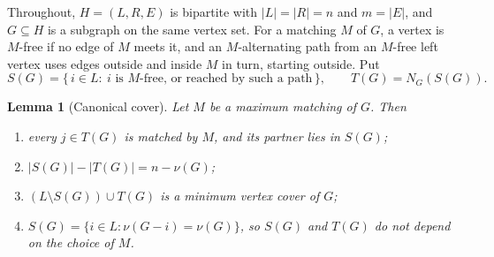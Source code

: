 \documentclass[11pt]{article}
\newtheorem{lemma}[theorem]{Lemma}
\begin{document}
Throughout, $H=(L,R,E)$ is bipartite with $|L|=|R|=n$ and $m=|E|$, and
$G\subseteq H$ is a subgraph on the same vertex set.  For a matching $M$ of $G$,
a vertex is $M$-free if no edge of $M$ meets it, and an $M$-alternating path
from an $M$-free left vertex uses edges outside and inside $M$ in turn, starting
outside.  Put
\[
  S(G)=\{\,i\in L:\ i \text{ is } M\text{-free, or reached by such a path}\,\},
  \qquad
  T(G)=N_G(S(G)).
\]

\begin{lemma}[Canonical cover]
\label{lem:canonical}
Let $M$ be a maximum matching of $G$.  Then
\begin{enumerate}
  \item every $j\in T(G)$ is matched by $M$, and its partner lies in $S(G)$;
  \item $|S(G)|-|T(G)|=n-\nu(G)$;
  \item $(L\setminus S(G))\cup T(G)$ is a minimum vertex cover of $G$;
  \item $S(G)=\{i\in L:\nu(G-i)=\nu(G)\}$, so $S(G)$ and $T(G)$ do not depend on
        the choice of $M$.
\end{enumerate}
\end{lemma}
\end{document}
